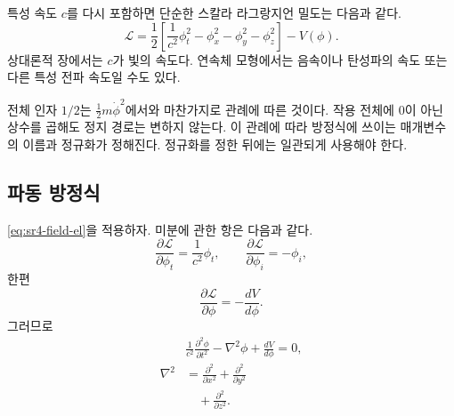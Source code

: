 특성 속도 \(c\)를 다시 포함하면 단순한 스칼라 라그랑지언 밀도는 다음과 같다.
\begin{equation}
\boxed{
\mathcal{L}
=
\frac12
\left[
\frac{1}{c^2}\phi_t^2
-\phi_x^2-\phi_y^2-\phi_z^2
\right]
-V(\phi)
}.
\label{eq:sr4-scalar-lagrangian}
\end{equation}
상대론적 장에서는 \(c\)가 빛의 속도다. 연속체 모형에서는 음속이나 탄성파의 속도 또는 다른 특성 전파 속도일 수도 있다.

전체 인자 \(1/2\)는 \(\tfrac12m\dot\phi^2\)에서와 마찬가지로 관례에 따른 것이다. 작용 전체에 0이 아닌 상수를 곱해도 정지 경로는 변하지 않는다. 이 관례에 따라 방정식에 쓰이는 매개변수의 이름과 정규화가 정해진다. 정규화를 정한 뒤에는 일관되게 사용해야 한다.

\begin{classroomqa}
\end{classroomqa}

\subsection{파동 방정식}

\eqref{eq:sr4-field-el}을 적용하자. 미분에 관한 항은 다음과 같다.
\begin{equation}
\frac{\partial\mathcal{L}}{\partial\phi_t}
=\frac{1}{c^2}\phi_t,
\qquad
\frac{\partial\mathcal{L}}{\partial\phi_i}
=-\phi_i,
\end{equation}
한편
\begin{equation}
\frac{\partial\mathcal{L}}{\partial\phi}
=-\frac{dV}{d\phi}.
\end{equation}
그러므로
\begin{equation}
\begin{aligned}
&\boxed{
\frac{1}{c^2}\frac{\partial^2\phi}{\partial t^2}
-\nabla^2\phi
+\frac{dV}{d\phi}
=0
},\\[0.5em]
\nabla^2
&=
\frac{\partial^2}{\partial x^2}
+\frac{\partial^2}{\partial y^2}\\
&\quad
+\frac{\partial^2}{\partial z^2}.
\end{aligned}
\label{eq:sr4-general-scalar-eom}
\end{equation}

